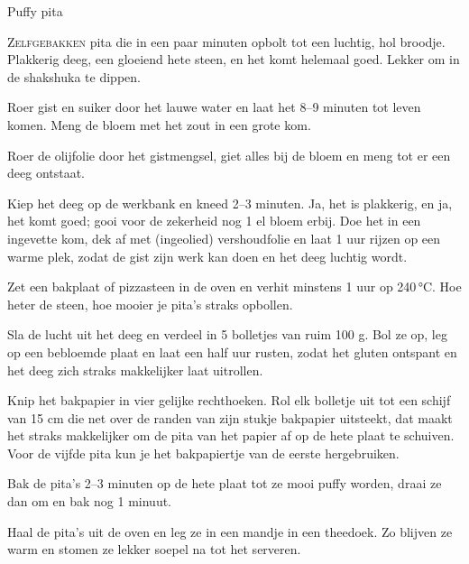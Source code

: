 \begin{recipe}{Puffy pita}
\label{recipe:pita}


\lettrine{Z}{elfgebakken} pita die in een paar minuten opbolt tot een luchtig,
hol broodje. Plakkerig deeg, een gloeiend hete steen, en het komt helemaal
goed. Lekker om in de shakshuka te dippen.

\begin{ingredients}
\end{ingredients}

\begin{steps}
  \item Roer gist en suiker door het lauwe water en laat het 8–9 minuten tot
        leven komen. Meng de bloem met het zout in een grote kom.
  \item Roer de olijfolie door het gistmengsel, giet alles bij de bloem en meng
        tot er een deeg ontstaat.
  \item Kiep het deeg op de werkbank en kneed 2–3 minuten. Ja, het is plakkerig,
        en ja, het komt goed; gooi voor de zekerheid nog 1 el bloem erbij. Doe
        het in een ingevette kom, dek af met (ingeolied) vershoudfolie en laat 1 uur
        rijzen op een warme plek, zodat de gist zijn werk kan doen en het deeg
        luchtig wordt.
  \item Zet een bakplaat of pizzasteen in de oven en verhit minstens 1 uur op
        240\,°C. Hoe heter de steen, hoe mooier je pita's straks opbollen.
  \item Sla de lucht uit het deeg en verdeel in 5 bolletjes van ruim 100 g. Bol ze
        op, leg op een bebloemde plaat en laat een half uur rusten, zodat het
        gluten ontspant en het deeg zich straks makkelijker laat uitrollen.
  \item Knip het bakpapier in vier gelijke rechthoeken. Rol elk bolletje uit tot
        een schijf van 15 cm die net over de randen van zijn stukje bakpapier
        uitsteekt, dat maakt het straks makkelijker om de pita van het papier af
        op de hete plaat te schuiven. Voor de vijfde pita kun je het bakpapiertje
        van de eerste hergebruiken.
  \item Bak de pita's 2–3 minuten op de hete plaat tot ze mooi puffy worden,
        draai ze dan om en bak nog 1 minuut.
  \item Haal de pita's uit de oven en leg ze in een mandje in een theedoek. Zo
        blijven ze warm en stomen ze lekker soepel na tot het serveren.
\end{steps}

\end{recipe}
